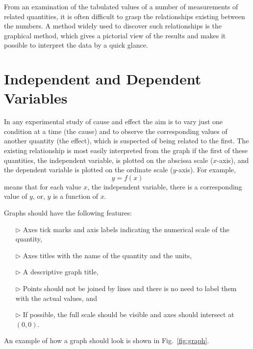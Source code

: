 

From an examination of the tabulated values of a number of measurements of related quantities, it is often difficult to grasp the relationships existing between the numbers. A method widely used to discover such relationships is the graphical method, which gives a pictorial view of the results and makes it possible to interpret the data by a quick glance.

\section{Independent and Dependent Variables}

In any experimental study of cause and effect the aim is to vary just one condition at a time (the cause) and to observe the corresponding values of another quantity (the effect), which is suspected of being related to the first. The existing relationship is most easily interpreted from the graph if the first of these quantities, the independent variable, is plotted on the abscissa scale ($x$-axis), and the dependent variable is plotted on the ordinate scale ($y$-axis). For example,
\[
y = f(x)
\]
means that for each value $x$, the independent variable, there is a corresponding value of $y$, or, $y$ is a function of $x$.

Graphs should have the following features:
\begin{itemize}
\item[$\triangleright$] Axes tick marks and axis labels indicating the numerical scale  of the quantity,
\item[$\triangleright$] Axes titles with the name of the quantity and the units,
\item[$\triangleright$] A descriptive graph title,
\item[$\triangleright$] Points should not be joined by lines and there is no need to label them with the actual values, and
\item[$\triangleright$] If possible, the full scale should be visible and axes should intersect at $(0,0)$.
\end{itemize}
An example of how a graph should look is shown in Fig.~\ref{fig:graph}.

